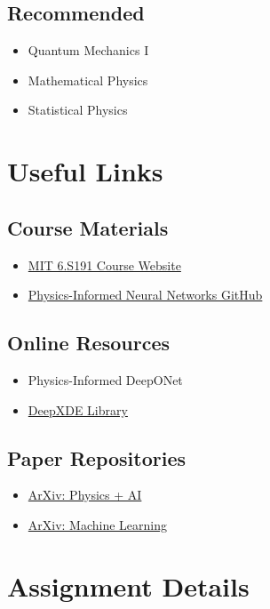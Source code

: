 \documentclass[11pt,a4paper]{article}
\begin{document}
\subsection*{Recommended}
\begin{itemize}[noitemsep]
    \item Quantum Mechanics I
    \item Mathematical Physics
    \item Statistical Physics
\end{itemize}

\section{Useful Links}

\subsection{Course Materials}
\begin{itemize}[noitemsep]
    \item \href{http://introtodeeplearning.com/}{MIT 6.S191 Course Website}
    \item \href{https://github.com/maziarraissi/PINNs}{Physics-Informed Neural Networks GitHub}
\end{itemize}

\subsection{Online Resources}
\begin{itemize}[noitemsep]
    \item Physics-Informed DeepONet
    \item \href{https://deepxde.readthedocs.io/}{DeepXDE Library}
\end{itemize}

\subsection{Paper Repositories}
\begin{itemize}[noitemsep]
    \item \href{https://arxiv.org/list/physics.comp-ph/recent}{ArXiv: Physics + AI}
    \item \href{https://arxiv.org/list/cs.LG/recent}{ArXiv: Machine Learning}
\end{itemize}

\section{Assignment Details}
\end{document}
